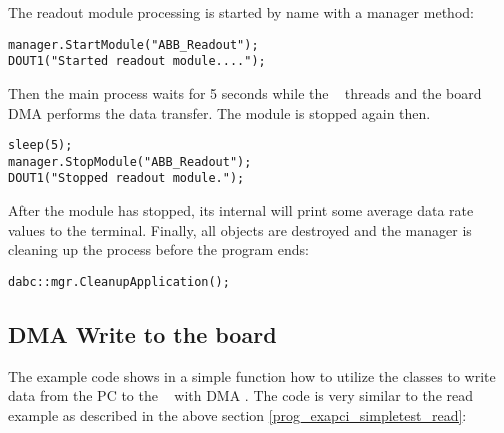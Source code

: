 \begin{compactenum}
\item The readout module processing 
is started by name with a manager method:
\begin{small}
\begin{verbatim}
manager.StartModule("ABB_Readout");
DOUT1("Started readout module....");
\end{verbatim}
\end{small}
Then the main process waits for 5 seconds while the \dabc~ threads
and the board DMA performs the data transfer. The module is stopped
again then.
\begin{small}
\begin{verbatim}      
sleep(5);
manager.StopModule("ABB_Readout");
DOUT1("Stopped readout module.");
\end{verbatim}
\end{small}
After the module has stopped, its internal 
will print some average data rate values to the terminal.
Finally, all objects are destroyed and the manager is
cleaning up the process before the program ends:
\begin{small}
\begin{verbatim} 
dabc::mgr.CleanupApplication();
\end{verbatim}
\end{small}
   
\end{compactenum} 

\subsection{DMA Write to the board}
\label{prog_exapci_simpletest_write}
The example code  shows in a
simple  function how to utilize the
 classes to write data from the PC to the \ABB~ 
with DMA . 
The code is very similar to the read example as described
in the above section \ref{prog_exapci_simpletest_read}:

